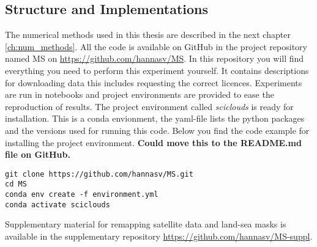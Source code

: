 \subsection{Structure and Implementations}
The numerical methods used in this thesis are described in the next chapter \ref{ch:num_methods}. All the code is available on GitHub in the project repository named MS on \href{https://github.com/hannasv/MS}{https://github.com/hannasv/MS}. In this repository you will find everything you need to perform this experiment yourself. It contains descriptions for downloading data this includes requesting the correct licences. Experiments are run in notebooks and project environments are provided to ease the reproduction of results. The project environment called \textit{sciclouds} is ready for installation. This is a conda envionment, the yaml-file lists the python packages and the versions used for running this code. Below you find the code example for installing the project environment.
\textbf{Could move this to the README.md file on GitHub.}
\begin{verbatim}
git clone https://github.com/hannasv/MS.git
cd MS
conda env create -f environment.yml
conda activate sciclouds
\end{verbatim}
Supplementary material for remapping satellite data and land-sea masks is available in the supplementary repository \href{https://github.com/hannasv/MS-suppl}{https://github.com/hannasv/MS-suppl}.